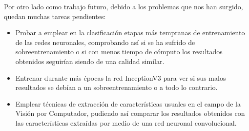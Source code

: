Por otro lado como trabajo futuro, debido a los problemas que nos han surgido, quedan muchas tareas pendientes:

\begin{itemize}
\item Probar a emplear en la clasificación etapas más tempranas de entrenamiento de las redes neuronales, comprobando así si se ha sufrido de sobreentrenamiento o si con menos tiempo de cómputo los resultados obtenidos seguirían siendo de una calidad similar.
\item Entrenar durante más épocas la red InceptionV3 para ver si sus malos resultados se debían a un sobreentrenamiento o a todo lo contrario.
\item Emplear técnicas de extracción de características usuales en el campo de la Visión por Computador, pudiendo así comparar los resultados obtenidos con las características extraídas por medio de una red neuronal convolucional.
\end{itemize}